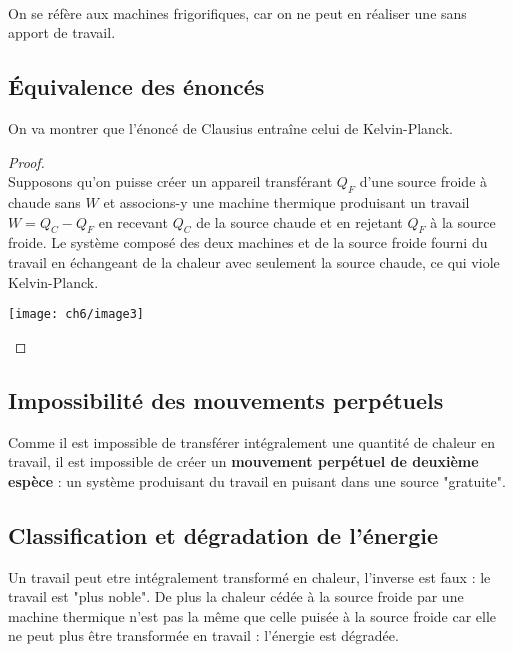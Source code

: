 	\ \\
	On se réfère aux machines frigorifiques, car on ne peut en 
	réaliser une sans apport de travail.
	
		\subsection{Équivalence des énoncés} 
		On va montrer que l'énoncé de Clausius entraîne celui de 
		Kelvin-Planck.
		
		\begin{proof}\ \\
		Supposons qu'on puisse créer un appareil transférant $Q_F$ 
		d'une source froide à chaude sans $W$ et associons-y une 
		machine thermique produisant un travail $W=Q_C-Q_F$ en 
		recevant $Q_C$ de la source chaude et en rejetant $Q_F$ à la source froide. 
		Le système composé des deux machines et de la source 
		froide fourni du travail en échangeant de la chaleur avec 
		seulement la source chaude, ce qui viole Kelvin-Planck.
		
		\begin{center}
		\texttt{[image: ch6/image3]}
		\end{center}
		\end{proof}
		
		\subsection{Impossibilité des mouvements perpétuels}
		Comme il est impossible de transférer intégralement une 
		quantité de chaleur en travail, il est impossible de créer 
		un \textbf{mouvement perpétuel de deuxième espèce} : un 
		système produisant du travail en puisant dans une source 
		"gratuite".
		
		\subsection{Classification et dégradation de l'énergie}
		Un travail peut etre intégralement transformé en chaleur, 
		l'inverse est faux : le travail est "plus noble". De plus 
		la chaleur cédée à la source froide par une machine 
		thermique n'est pas la même que celle puisée à la source 
		froide car elle ne peut plus être transformée en travail : 
		l'énergie est dégradée.


